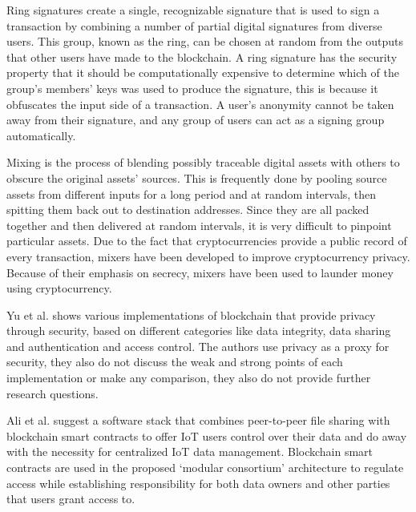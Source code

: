 Ring signatures create a single, recognizable signature that is used to sign
a transaction by combining a number of partial digital signatures from diverse
users. This group, known as the ring, can be chosen at random from the outputs
that other users have made to the blockchain. A ring signature has the security
property that it should be computationally expensive to determine which
of the group's members' keys was used to produce the signature, this is because
it obfuscates the input side of a transaction. A user's anonymity cannot
be taken away from their signature, and any group of users can act as a signing
group automatically.

Mixing is the process of blending possibly traceable digital assets
with others to obscure the original assets' sources. This is frequently done
by pooling source assets from different inputs for a long period and at random
intervals, then spitting them back out to destination addresses. Since they
are all packed together and then delivered at random intervals, it is very
difficult to pinpoint particular assets. Due to the fact that cryptocurrencies
provide a public record of every transaction, mixers have been developed
to improve cryptocurrency privacy. Because of their emphasis on secrecy,
mixers have been used to launder money using cryptocurrency.

Yu et al. \cite{yu2018blockchain} shows various implementations of blockchain
that provide privacy through security, based on different categories like
data integrity, data sharing and authentication and access control. The
authors use privacy as a proxy for security, they also do not discuss the
weak and strong points of each implementation or make any comparison, they
also do not provide further research questions.


Ali et al. \cite{AliIoT} suggest a software stack that combines peer-to-peer
file sharing with blockchain smart contracts to offer IoT users control
over their data and do away with the necessity for centralized IoT data
management. Blockchain smart contracts are used in the proposed `modular
consortium' architecture to regulate access while establishing responsibility
for both data owners and other parties that users grant access to.

